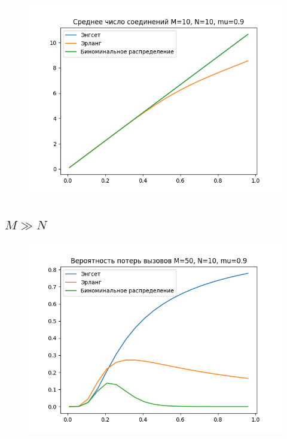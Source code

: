 \documentclass[12pt]{article}
\begin{document}
\begin{figure}[!htb]
\centering
\includegraphics[scale=1.00]{aver_conn_M10_N10_mu09.png}
\caption{}
\label{}
\end{figure}

\subsection{$M ≫ N$}
\begin{figure}[!htb]
\centering
\includegraphics[scale=1.00]{loss_prob_M50_N10_mu09.png}
\caption{}
\label{}
\end{figure}
\end{document}
